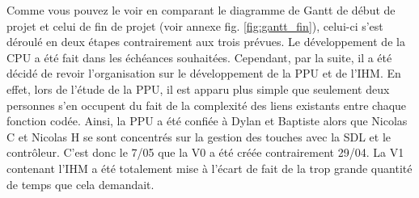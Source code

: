 Comme vous pouvez le voir en comparant le diagramme de Gantt de début de projet et celui de fin de projet (voir annexe fig. \ref{fig:gantt_fin}), celui-ci s'est déroulé en deux étapes contrairement aux trois prévues. Le développement de la CPU a été fait dans les échéances souhaitées. Cependant, par la suite, il a été décidé de revoir l'organisation sur le développement de la PPU et de l'IHM. En effet, lors de l'étude de la PPU, il est apparu plus simple que seulement deux personnes s'en occupent du fait de la complexité des liens existants entre chaque fonction codée. Ainsi, la PPU a été confiée à Dylan et Baptiste alors que Nicolas C et Nicolas H se sont concentrés sur la gestion des touches avec la SDL et le contrôleur. C'est donc le 7/05 que la V0 a été créée contrairement 29/04. La V1 contenant l'IHM a été totalement mise à l'écart de fait de la trop grande quantité de temps que cela demandait.
